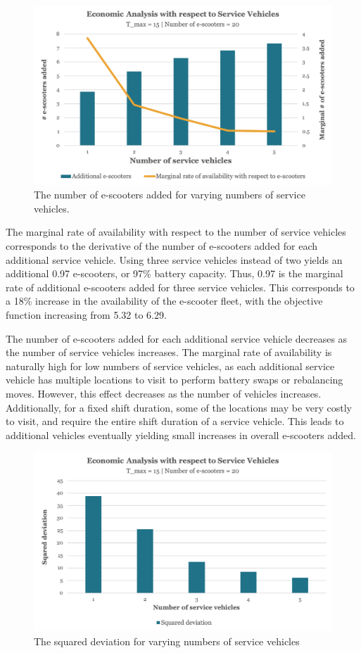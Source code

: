 \begin{figure}[H]
    \centering
    \includegraphics[width=0.8\columnwidth]{Images/Computational Study/econ_vehical_marg.png}
    \caption{The number of e-scooters added for varying numbers of service vehicles.}
    \label{fig:econ_v}
\end{figure}

The marginal rate of availability with respect to the number of service vehicles corresponds to the derivative of the number of e-scooters added for each additional service vehicle. Using three service vehicles instead of two yields an additional 0.97 e-scooters, or 97\% battery capacity. Thus, 0.97 is the marginal rate of additional e-scooters added for three service vehicles. This corresponds to a 18\% increase in the availability of the e-scooter fleet, with the objective function increasing from 5.32 to 6.29. 

The number of e-scooters added for each additional service vehicle decreases as the number of service vehicles increases. The marginal rate of availability is naturally high for low numbers of service vehicles, as each additional service vehicle has multiple locations to visit to perform battery swaps or rebalancing moves. However, this effect decreases as the number of vehicles increases. Additionally, for a fixed shift duration, some of the locations may be very costly to visit, and require the entire shift duration of a service vehicle. This leads to additional vehicles eventually yielding small increases in overall e-scooters added.

\begin{figure}[H]
    \centering
    \includegraphics[width=0.8\columnwidth]{Images/Computational Study/econ_vehical.png}
    \caption{The squared deviation for varying numbers of service vehicles}
    \label{fig:econ_v_deviation}
\end{figure}

